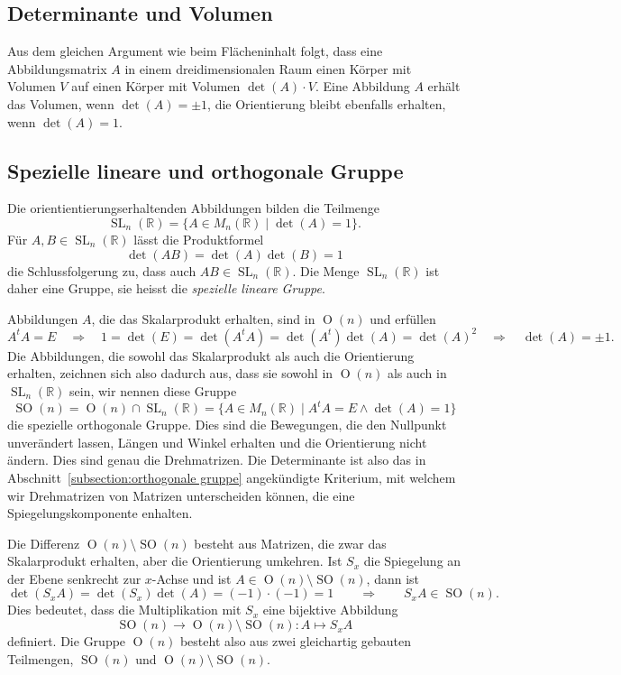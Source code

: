 \subsection{Determinante und Volumen}
Aus dem gleichen Argument wie beim Flächeninhalt folgt, dass eine
Abbildungsmatrix $A$ in einem dreidimensionalen Raum einen Körper mit
Volumen $V$ auf einen Körper mit Volumen $\det(A)\cdot V$.
Eine Abbildung $A$ erhält das Volumen, wenn $\det(A)=\pm 1$,
die Orientierung bleibt ebenfalls erhalten, wenn $\det(A)=1$.

\subsection{Spezielle lineare und orthogonale Gruppe}
Die orientientierungserhaltenden Abbildungen bilden die Teilmenge
\[
\operatorname{SL}_n(\mathbb R)
=
\{
A\in M_n(\mathbb R)
\;|\;
\det(A) = 1
\}.
\]
Für $A,B\in\operatorname{SL}_n(\mathbb R)$ lässt die
Produktformel
\[
\det(AB)=\det(A)\det(B) = 1
\]
die Schlussfolgerung zu, dass auch $AB\in\operatorname{SL}_n(\mathbb R)$.
Die Menge $\operatorname{SL}_n(\mathbb R)$ ist daher eine Gruppe, sie
heisst die {\em spezielle lineare Gruppe}.

Abbildungen $A$, die das Skalarprodukt erhalten, sind in $\operatorname{O}(n)$ und erfüllen
\[
A^tA=E
\quad\Rightarrow\quad
1
=
\det(E)
=
\det(A^tA)=\det(A^t)\det(A)=\det(A)^2
\quad\Rightarrow\quad
\det(A) = \pm 1.
\]
Die Abbildungen, die sowohl das Skalarprodukt als auch die Orientierung
erhalten, zeichnen sich also dadurch aus, dass sie sowohl in
$\operatorname{O}(n)$ als auch in $\operatorname{SL}_n(\mathbb R)$ sein, wir nennen diese
Gruppe
\[
\operatorname{SO}(n) 
=
\operatorname{O}(n) \cap \operatorname{SL}_n(\mathbb R)
=
\{
A\in M_n(\mathbb R)\;|\; A^tA=E\wedge \det(A) = 1
\}
\]
die spezielle orthogonale Gruppe.
Dies sind die Bewegungen, die den Nullpunkt unverändert lassen,
Längen und Winkel erhalten und die Orientierung nicht ändern.
Dies sind genau die Drehmatrizen.
Die Determinante ist also das in Abschnitt~\ref{subsection:orthogonale gruppe}
angekündigte Kriterium, mit welchem wir Drehmatrizen von Matrizen
unterscheiden können, die eine Spiegelungskomponente enhalten.

Die Differenz $\operatorname{O}(n) \setminus \operatorname{SO}(n)$
besteht aus Matrizen, die zwar das Skalarprodukt erhalten, aber die
Orientierung umkehren.
Ist $S_x$ die Spiegelung an der Ebene senkrecht zur $x$-Achse und ist
$A\in \operatorname{O}(n) \setminus \operatorname{SO}(n)$, dann ist
\[
\det(S_xA)= \det(S_x)\det(A) = (-1)\cdot(-1)=1
\qquad\Rightarrow\qquad
S_xA\in\operatorname{SO}(n).
\]
Dies bedeutet, dass die Multiplikation mit $S_x$ eine bijektive Abbildung
\[
\operatorname{SO}(n) \to \operatorname{O}(n)\setminus\operatorname{SO}(n)
:
A\mapsto S_xA
\]
definiert.
Die Gruppe $\operatorname{O}(n)$ besteht also aus zwei gleichartig gebauten
Teilmengen, $\operatorname{SO}(n)$  und
$\operatorname{O}(n)\setminus\operatorname{SO}(n)$.



